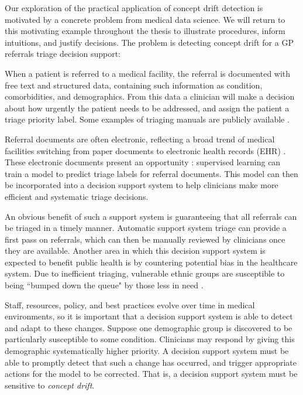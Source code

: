 Our exploration of the practical application of concept drift detection is motivated by a concrete problem from medical data science. We will return to this motivating example throughout the thesis to illustrate procedures, inform intuitions, and justify decisions. The problem is detecting concept drift for a GP referrals triage decision support:
\begin{displayquote}
  When a patient is referred to a medical facility, the referral is documented with free text and structured data, containing such information as condition, comorbidities, and demographics. From this data a clinician will make a decision about how urgently the patient needs to be addressed, and assign the patient a triage priority label. Some examples of triaging manuals are publicly available \cite{aus_triage}\cite{UK_mental_triage}\cite{musculoskeletal_services}.

  Referral documents are often electronic, reflecting a broad trend of medical facilities switching from paper documents to electronic health records (EHR) \cite{ehr_adoption}. These electronic documents present an opportunity \cite{ehr_opportunities}: supervised learning can train a model to predict triage labels for referral documents. This model can then be incorporated into a decision support system to help clinicians make more efficient and systematic triage decisions.

  An obvious benefit of such a support system is guaranteeing that all referrals can be triaged in a timely manner. Automatic support system triage can provide a first pass on referrals, which can then be manually reviewed by clinicians once they are available. Another area in which this decision support system is expected to benefit public health is by countering potential bias in the healthcare system. Due to inefficient triaging, vulnerable ethnic groups are susceptible to being ``bumped down the queue" by those less in need \cite{pdh}.

  Staff, resources, policy, and best practices evolve over time in medical environments, so it is important that a decision support system is able to detect and adapt to these changes. Suppose one demographic group is discovered to be particularly susceptible to some condition. Clinicians may respond by giving this demographic systematically higher priority. A decision support system must be able to promptly detect that such a change has occurred, and trigger appropriate actions for the model to be corrected. That is, a decision support system must be sensitive to {\it concept drift}.


\end{displayquote}

